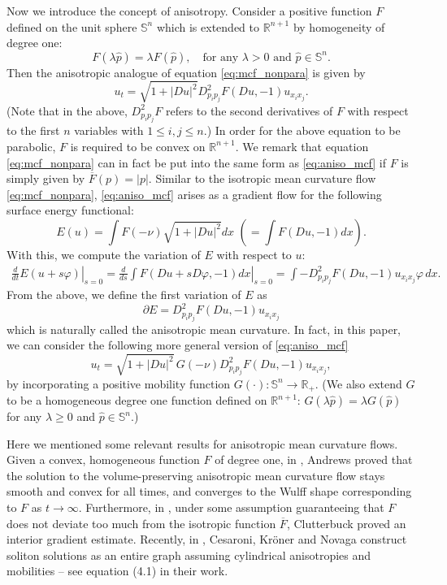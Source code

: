 \documentclass[12pt]{article}
\numberwithin{equation}{section}
\theoremstyle{plain}
\theoremstyle{definition}
\theoremstyle{remark}
\begin{document}
Now we introduce the concept of anisotropy. Consider a positive function $F$ defined on the unit sphere $\mathbb{S}^{n}$ 
which is extended to $\mathbb{R}^{n+1}$ by homogeneity of degree one:
\[
F(\lambda\hat{p}) = \lambda F(\hat{p}),\quad\text{for any $\lambda > 0$ and $\hat{p}\in\mathbb{S}^n$}.
\]
Then the anisotropic analogue of equation \eqref{eq:mcf_nonpara} is given by
\begin{equation} \label{eq:aniso_mcf}
    u_t = \sqrt{1+|Du|^2} D^2_{p_i p_j} F (Du,-1) u_{x_i x_j}.
\end{equation}
(Note that in the above, $D^2_{p_ip_j}F$ refers to the second derivatives of $F$ with respect to the first $n$ variables with $1\leq i,j\leq n$.)
In order for the above equation to be parabolic, $F$ is required to be convex on $\mathbb{R}^{n+1}$.
We remark that equation \eqref{eq:mcf_nonpara} can in fact be put into the same form as \eqref{eq:aniso_mcf} if $F$ is 
simply given by $\overline{F}(p) = |p|$. Similar to the isotropic mean curvature flow \eqref{eq:mcf_nonpara}, \eqref{eq:aniso_mcf} arises as a gradient flow for the following surface energy functional: 
 \begin{equation} \label{eq:sur_energy}
    E(u) = \int F(-\nu)\sqrt{1+|Du|^2} dx
    \,\,\left(=
    \int F(Du, -1)dx
    \right).
\end{equation}
With this, we compute the variation of $E$ with respect to $u$:
\begin{eqnarray*}
\left.\frac{d}{dt}E(u+s\varphi)\right|_{s=0}
= \left.\frac{d}{ds}\int F(Du + sD\varphi, -1)dx\right|_{s=0}
= \int -D^2_{p_ip_j}F(Du,-1)u_{x_ix_j}\varphi\,dx.
\end{eqnarray*}
From the above, we define the first variation of $E$ as 
\[
\partial E = D^2_{p_i p_j} F (Du,-1) u_{x_i x_j}
\]
which is naturally called the anisotropic mean curvature.
In fact, in this paper, we can consider the following more general version of \eqref{eq:aniso_mcf}
\begin{equation} \label{eq:ansio_mob_mcf}
    u_t = \sqrt{1+|D u|^2}\,G(-\nu)D^2_{p_i p_j} F (Du,-1) u_{x_i x_j},
\end{equation}
by incorporating a positive mobility function $G(\cdot):\mathbb{S}^n\longrightarrow\mathbb{R}_+$. (We also extend $G$ to be a homogeneous degree one function defined on $\mathbb{R}^{n+1}$: $G(\lambda \hat{p}) = \lambda G(\hat{p})$
for any $\lambda \geq 0$ and $\hat{p}\in \mathbb{S}^{n}$.)

Here we mentioned some relevant results for anisotropic mean curvature flows. Given a convex, homogeneous function $F$ of degree one, in \cite{An1}, Andrews proved that the solution to the volume-preserving anisotropic mean curvature flow stays smooth and convex for all times, and converges to the Wulff shape corresponding to $F$ as $t\longrightarrow\infty$. Furthermore, in \cite{Cl}, under some assumption guaranteeing that $F$ does not deviate too much from the isotropic function $\overline{F}$, Clutterbuck proved an interior gradient estimate. Recently, in \cite{CKN}, Cesaroni, Kr{\"o}ner and Novaga construct soliton solutions as an entire graph assuming cylindrical anisotropies and mobilities -- see equation (4.1) in their work. 
\end{document}
